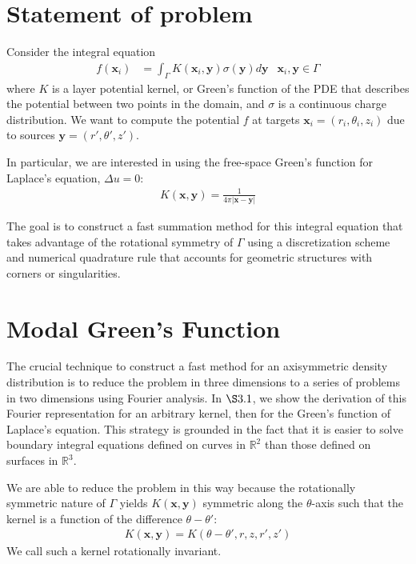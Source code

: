 \documentclass[11pt, oneside]{article}   	%
\begin{document}
\section{Statement of problem}
Consider the integral equation
\begin{align}
f(\mathbf{x}_i) &= \int_\Gamma K(\mathbf{x}_i,\mathbf{y})\sigma(\mathbf{y})d\mathbf{y} &\mathbf{x}_i,\mathbf{y}\in\Gamma
\end{align}
where $K$ is a layer potential kernel, or Green's function of the PDE that describes the potential between two points in the domain, and $\sigma$ is a continuous charge distribution. We want to compute the potential $f$  at targets $\mathbf{x}_i = (r_i,\theta_i,z_i)$ due to sources $\mathbf{y}=(r',\theta',z')$.

In particular, we are interested in using the free-space Green's function for Laplace's equation, $\Delta u = 0$:
\begin{align}
K(\mathbf{x},\mathbf{y}) = \frac{1}{4\pi |\mathbf{x}-\mathbf{y}|}
\end{align}

The goal is to construct a fast summation method for this integral equation that takes advantage of the rotational symmetry of $\Gamma$ using a discretization scheme and numerical quadrature rule that accounts for geometric structures with corners or singularities.

\section{Modal Green's Function}

The crucial technique to construct a fast method for an axisymmetric density distribution is to reduce the problem in three dimensions to a series of problems in two dimensions using Fourier analysis. In $\S3.1$, we show the derivation of this Fourier representation for an arbitrary kernel, then for the Green's function of Laplace's equation. This strategy is grounded in the fact that it is easier to solve boundary integral equations defined on curves in $\mathbb{R}^2$ than those defined on surfaces in $\mathbb{R}^3$.

We are able to reduce the problem in this way because the rotationally symmetric nature of $\Gamma$ yields $K(\mathbf{x},\mathbf{y})$ symmetric along the $\theta$-axis such that the kernel is a function of the difference $\theta-\theta'$:
\begin{align*}
K(\mathbf{x},\mathbf{y})=K(\theta-\theta',r,z,r',z')
\end{align*}
We call such a kernel rotationally invariant.
\end{document}
